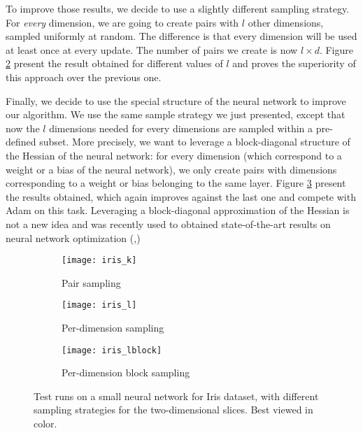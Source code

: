 {{			To improve those results, we decide to use a slightly different sampling strategy. For \emph{every} dimension, we are going to create pairs with $l$ other dimensions, sampled uniformly at random. The difference is that every dimension will be used at least once at every update. The number of pairs we create is now $l\times d$. Figure \ref{fig::netl} present the result obtained for different values of $l$ and proves the superiority of this approach over the previous one. 
			
			Finally, we decide to use the special structure of the neural network to improve our algorithm. We use the same sample strategy we just presented, except that now the $l$ dimensions needed for every dimensions are sampled within a pre-defined subset. More precisely, we want to leverage a block-diagonal structure of the Hessian of the neural network: for every dimension (which correspond to a weight or a bias of the neural network), we only create pairs with dimensions corresponding to a weight or bias belonging to the same layer. Figure \ref{fig::netlblock} present the results obtained, which again improves against the last one and compete with Adam on this task. Leveraging a block-diagonal approximation of the Hessian is not a new idea and was recently used to obtained state-of-the-art results on neural network optimization (\cite{martens2015optimizing},\cite{zhang2017block})
			
			\begin{figure}[h!]
			\centering
			\begin{subfigure}[b]{0.33\linewidth}
			{
				\centering
				\texttt{[image: iris\_k]}
				\caption{Pair sampling}
				\label{fig::netk}
			}
			\end{subfigure}\hfill
			\begin{subfigure}[b]{0.33\linewidth}
			{
				\centering
				\texttt{[image: iris\_l]}
				\caption{Per-dimension sampling}
				\label{fig::netl}
			}
			\end{subfigure}\hfill
			\begin{subfigure}[b]{0.33\linewidth}
			{
				\centering
				\texttt{[image: iris\_lblock]}
				\caption{Per-dimension block sampling}
				\label{fig::netlblock}
			}
			\end{subfigure}
			\caption[Test runs on a small neural network for Iris dataset]{Test runs on a small neural network for Iris dataset, with different sampling strategies for the two-dimensional slices. Best viewed in color.}
			\label{fig::net_test}
		\end{figure}

		}
	}

